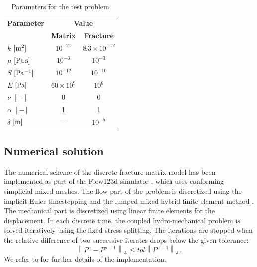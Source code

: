 \documentclass[a4paper]{article}
\numberwithin{equation}{section}
\def\Hf{\mathscr{L}} %
\def\norm#1{\left\|#1\right\|}
\newcommand{\eq}[1]{\begin{equation}#1\end{equation}}
\begin{document}
\begin{table}
\centering
\begin{tabular}{|l|c|c|}
\hline
\bf Parameter & \multicolumn{2}{|c|}{\bf Value}\\\cline{2-3}
& \bf Matrix & \bf Fracture\\
\hline
$k$ $[\rm m^2]$ & $10^{-21}$ & $8.3\times 10^{-12}$\\
$\mu$ $[\rm Pa\, s]$ & $10^{-3}$ & $10^{-3}$\\
$S$ $[\rm Pa^{-1}]$ & $10^{-12}$ & $10^{-10}$\\
$E$ $[\rm Pa]$ & $60\times 10^9$ & $10^{6}$ \\
$\nu$ $[-]$ & 0 & 0\\
$\alpha$ $[-]$ & 1 & 1\\
$\delta$ $[\rm m]$ & --- & $10^{-5}$\\
\hline
\end{tabular}
\caption{Parameters for the test problem.}
\label{tab:test_params}
\end{table}

\subsection{Numerical solution}
The numerical scheme of the discrete fracture-matrix model has been implemented as part of the 
Flow123d simulator \cite{flow123d}, which uses conforming simplicial mixed meshes.
The flow part of the problem is discretized using the implicit Euler timestepping and the lumped mixed hybrid finite element method \cite{Younes2006}.
The mechanical part is discretized using linear finite elements for the displacement.
In each discrete time, the coupled hydro-mechanical problem is solved iteratively using the fixed-stress splitting.
The iterations are stopped when the relative difference of two successive iterates drops below the given tolerance:
\eq{ \norm{P^{n}-P^{n-1}}_\Hf \le tol\norm{P^{n-1}}_\Hf. }
We refer to \cite{flow123d} for further details of the implementation.
\end{document}

